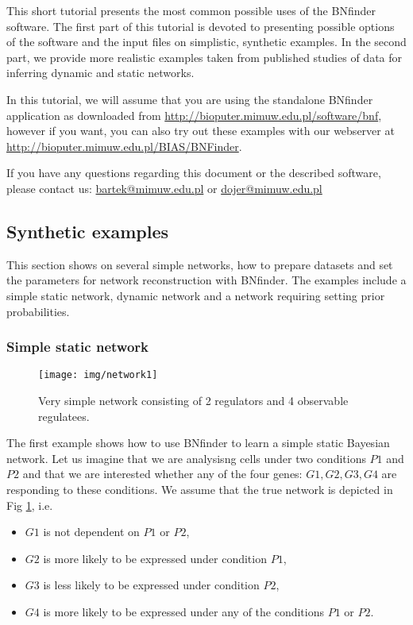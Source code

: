 
This short tutorial presents the most common possible uses of the
BNfinder software. The first part of this tutorial is devoted to
presenting possible options of the software and the input files on
simplistic, synthetic examples. In the second part, we provide more
realistic examples taken from published studies of data for inferring
dynamic and static networks.

In this tutorial, we will assume that you are using the standalone
BNfinder application as downloaded from
\url{http://bioputer.mimuw.edu.pl/software/bnf}, however if you want,
you can also try out these examples with our webserver at
\url{http://bioputer.mimuw.edu.pl/BIAS/BNFinder}.

If you have any questions regarding this document or the described
software, please contact us:
 \url{bartek@mimuw.edu.pl} or \url{dojer@mimuw.edu.pl}
\subsection{Synthetic examples}
\label{sec:simple}
This section shows on several simple networks, how to prepare datasets
and set the parameters for network reconstruction with BNfinder. The
examples include a simple static network, dynamic network and a
network requiring setting prior probabilities.

\subsubsection{Simple static network}
\label{sec:simstat}

\begin{figure}[h]
  \centering
  \texttt{[image: img/network1]}  
  \caption{Very simple network consisting of 2 regulators and 4 observable regulatees.}
  \label{fig:net1}
\end{figure}

The first example shows how to use BNfinder to learn a simple static
Bayesian network. Let us imagine that we are analysisng cells under
two conditions $P1$ and $P2$ and that we are interested whether any of
the four genes: $G1,G2,G3,G4$ are responding to these conditions. We
assume that the true network is depicted in Fig \ref{fig:net1}, i.e. 
\begin{itemize}
\item $G1$ is not dependent on $P1$ or $P2$,
\item $G2$  is more likely to be expressed under condition $P1$,
\item $G3$ is less  likely to be expressed under condition $P2$,
\item $G4$ is more likely to  be expressed under any of the conditions $P1$ or $P2$.
\end{itemize}

